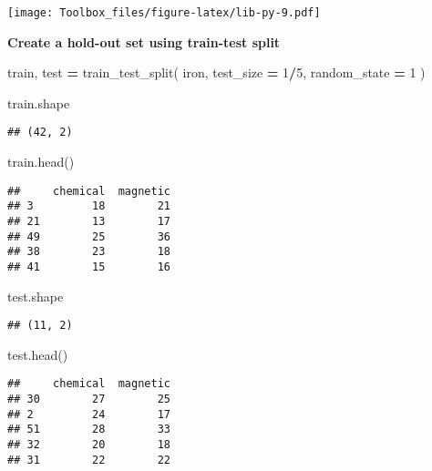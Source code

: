 \documentclass[
]{book}
\newenvironment{Shaded}{\begin{snugshade}}{\end{snugshade}}
\newcommand{\DecValTok}[1]{\textcolor[rgb]{0.00,0.00,0.81}{#1}}
\newcommand{\NormalTok}[1]{#1}
\newcommand{\OperatorTok}[1]{\textcolor[rgb]{0.81,0.36,0.00}{\textbf{#1}}}
\begin{document}
\texttt{[image: Toolbox\_files/figure-latex/lib-py-9.pdf]}

\textbf{Create a hold-out set using train-test split}

\begin{Shaded}
\begin{Highlighting}[]
\NormalTok{train, test }\OperatorTok{=}\NormalTok{ train\_test\_split(}
\NormalTok{  iron, test\_size }\OperatorTok{=} \DecValTok{1}\OperatorTok{/}\DecValTok{5}\NormalTok{, random\_state }\OperatorTok{=} \DecValTok{1}
\NormalTok{)}
\end{Highlighting}
\end{Shaded}

\begin{Shaded}
\begin{Highlighting}[]
\NormalTok{train.shape}
\end{Highlighting}
\end{Shaded}

\begin{verbatim}
## (42, 2)
\end{verbatim}

\begin{Shaded}
\begin{Highlighting}[]
\NormalTok{train.head()}
\end{Highlighting}
\end{Shaded}

\begin{verbatim}
##     chemical  magnetic
## 3         18        21
## 21        13        17
## 49        25        36
## 38        23        18
## 41        15        16
\end{verbatim}

\begin{Shaded}
\begin{Highlighting}[]
\NormalTok{test.shape}
\end{Highlighting}
\end{Shaded}

\begin{verbatim}
## (11, 2)
\end{verbatim}

\begin{Shaded}
\begin{Highlighting}[]
\NormalTok{test.head()}
\end{Highlighting}
\end{Shaded}

\begin{verbatim}
##     chemical  magnetic
## 30        27        25
## 2         24        17
## 51        28        33
## 32        20        18
## 31        22        22
\end{verbatim}
\end{document}
